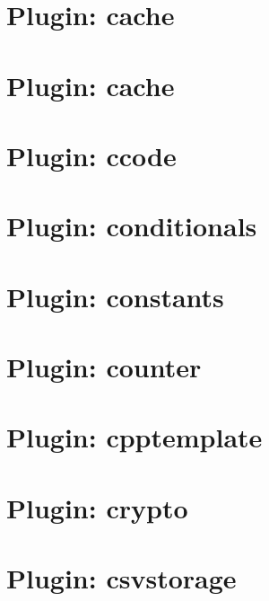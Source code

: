 \let\mypdfximage\pdfximage\def\pdfximage{\immediate\mypdfximage}\documentclass[twoside]{book}
\newcommand{\+}{\discretionary{\mbox{\scriptsize$\hookleftarrow$}}{}{}}
\begin{document}
\chapter{Plugin\+: cache}
\label{md_src_plugins_cache_README}

\chapter{Plugin\+: cache}
\label{md_src_plugins_cache_shelltests}

\chapter{Plugin\+: ccode}
\label{md_src_plugins_ccode_README}

\chapter{Plugin\+: conditionals}
\label{md_src_plugins_conditionals_README}

\chapter{Plugin\+: constants}
\label{md_src_plugins_constants_README}

\chapter{Plugin\+: counter}
\label{md_src_plugins_counter_README}

\chapter{Plugin\+: cpptemplate}
\label{md_src_plugins_cpptemplate_README}

\chapter{Plugin\+: crypto}
\label{md_src_plugins_crypto_README}

\chapter{Plugin\+: csvstorage}
\label{md_src_plugins_csvstorage_README}

\end{document}
